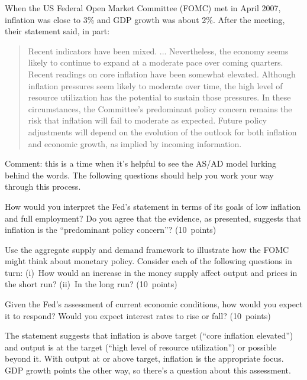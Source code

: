 \documentclass[letterpaper,12pt]{exam}
\begin{document}
\begin{questions}
When the US Federal Open Market Committee (FOMC) met in April 2007,
inflation was close to 3\% and GDP growth was about 2\%.
After the meeting,
their statement said, in part:
%
\begin{quote}
Recent indicators have been mixed. ...
Nevertheless, the economy seems likely to continue
to expand at a moderate pace over coming quarters.
%
Recent readings on core inflation have been somewhat elevated.
Although inflation pressures seem likely to moderate over time,
the high level of resource utilization has the potential
to sustain those pressures.
%
In these circumstances, the Committee's predominant policy concern remains the risk that inflation will fail to moderate as expected. Future policy adjustments will depend on the evolution of the outlook for both inflation and economic growth, as implied by incoming information.
\end{quote}
%
Comment:  this is a time when it's helpful to
see the AS/AD model lurking behind the words.
The following questions should help you work your
way through this process.
%
\begin{parts}
\item How would you interpret the Fed's statement in terms
of its goals of low inflation and full employment?
Do you agree that the evidence, as presented,
suggests that inflation is
the ``predominant policy concern''?
(10~points)

\item Use the aggregate supply and demand framework
to illustrate how the FOMC might think about monetary policy.
Consider each of the following questions in turn:
(i)~How would an increase in the money supply affect
output and prices in the short run?
(ii)~In the long run?
(10~points)

\item Given the Fed's assessment of current economic conditions,
how would you expect it to respond?
Would you expect interest rates to rise or fall?
(10~points)
\end{parts}

\begin{solution}
\begin{parts}
\item The statement suggests that inflation is above target
(``core inflation elevated'') and output is at the target
(``high level of resource utilization'') or possible beyond it.
With output at or above target, inflation is the appropriate focus.
GDP growth points the other way, so there's a question about this assessment.


\end{parts}
\end{solution}
\end{questions}
\end{document}
